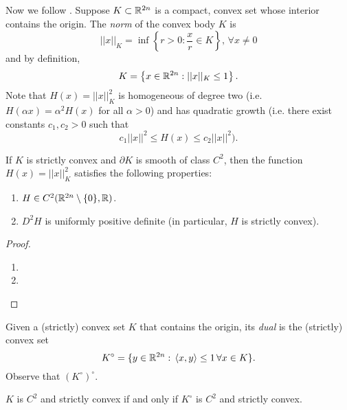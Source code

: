 \documentclass[../capacities_main.tex]{subfiles}
\begin{document}
	Now we follow \cite{hofer-zhender}. Suppose $K \subset {\mathbb R}^{2n}$ is a compact, convex set whose interior contains the origin.  The \emph{norm} of the convex body $K$ is
	\begin{equation*}
	||x||_K = \inf\left\{ r> 0 : \frac{x}{r} \in K\right\},\, \forall x \neq 0
	\end{equation*}
	and by definition,
	\begin{equation*}
	K = \left\{ x \in {\mathbb R}^{2n} : ||x||_K \leq 1\right\}.
	\end{equation*}
	Note that $H(x) = ||x||_K^2$ is homogeneous of degree two (i.e. $H(\alpha x) = \alpha^2H(x) $ for all $\alpha >0$) and has quadratic growth (i.e. there exist constants $c_1,c_2 >0$ such that 
	\begin{equation*}
	c_1||x||^2 \leq H(x) \leq c_2 ||x||^2).
	\end{equation*}
	
	\begin{Proposition}\label{function H}
		If $K$ is strictly convex and $\partial K$ is smooth of class $C^2$, then the function $H(x) = ||x||_K^2$ satisfies the following properties:
		\begin{enumerate}
			\item $H\in C^2({\mathbb R}^{2n}\setminus \{0\},{\mathbb R})$.
			\item $D^2H$ is uniformly positive definite (in particular, $H$ is strictly convex).
		\end{enumerate}
	\end{Proposition}
	
	\begin{proof}
		
		\begin{enumerate}
			\item 
			\item 
		\end{enumerate}
	\end{proof}
	
	Given a (strictly) convex set $K$ that contains the origin, its \emph{dual} is the (strictly) convex set
	\begin{equation*}
	K^{\circ} = \{ y\in {\mathbb R}^{2n} :\, \langle x,y \rangle \leq 1\, \forall x \in K \}.
	\end{equation*}
	Observe that $(K^{\circ})^{\circ}$.
	\begin{Proposition}
		$K$ is $C^2$ and strictly convex if and only if $K^{\circ}$ is $C^2$ and strictly convex.
	\end{Proposition}
	
\end{document}
